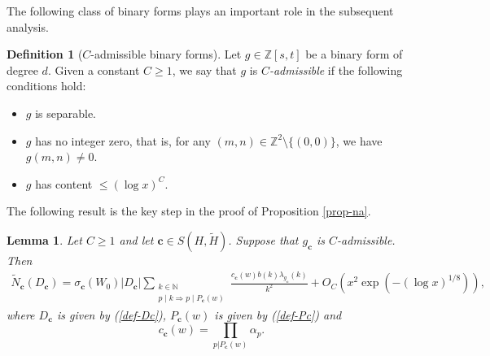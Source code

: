 \documentclass[reqno, 11pt]{amsart}
\renewcommand{\leq}{\leqslant}
\renewcommand{\geq}{\geqslant}
\renewcommand{\ge}{\geqslant}
\newtheorem{lemma}[theorem]{Lemma}
\theoremstyle{definition}
\theoremstyle{definition}
\newtheorem{definition}[theorem]{Definition}
\renewcommand{\geq}{\geqslant}
\renewcommand{\leq}{\leqslant}
\newcommand{\cc}{\mathbf{c}}
\newcommand{\ZZ}{\mathbb{Z}}
\numberwithin{equation}{section}
\begin{document}
The following class of binary forms plays an important role in the subsequent analysis.
\begin{definition}[\(C\)-admissible binary forms]\label{def-C-adm}
	Let \(g\in \ZZ[s,t]\) be a binary form of degree \(d\). Given a constant \(C\ge 1\), we say that \(g\) is \emph{\(C\)-admissible} if the following conditions hold:
\begin{itemize}
	\item $g$ is separable.
	\item $g$ has no integer zero, that is, for any $(m, n) \in \ZZ^2 \setminus \{(0,0)\}$, we have $g(m, n) \neq 0$.
	\item $g$ has content $\leq (\log x)^C$.
\end{itemize}
\end{definition}
The following result is the key step in the proof of Proposition \ref{prop-na}.
\begin{lemma}\label{BST-L-9.3}
	Let $C \geq 1$ and let $\cc \in S(H, \tilde{H})$. Suppose that $g_\cc$ is $C$-admissible. Then
	\begin{align*}
		\tilde{N}_\cc(D_\cc) = \sigma_\cc(W_0)|D_\cc| \sum_{\substack{k \in \mathbb{N} \\ p \mid k \Rightarrow p \mid P_\cc(w)}} 
\frac{c_\cc(w) b(k) \lambda_{g_\cc}(k)}{k^2} 
+ O_C \left( x^2 \exp \left( - (\log x)^{1/8} \right) \right),
	\end{align*} 
	where $D_\cc$ is given by (\ref{def-Dc}), $P_\cc(w)$ is given by (\ref{def-Pc}) and
	$$c_\cc(w) = \prod_{p | P_\cc(w)} \alpha_p.$$
\end{lemma}
\end{document}
